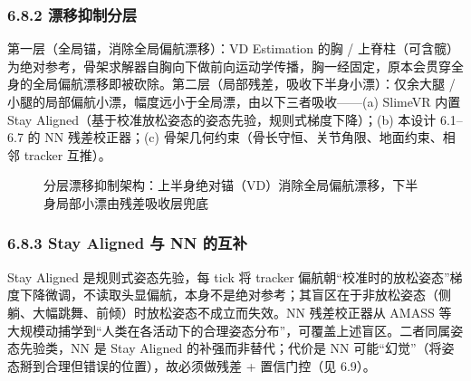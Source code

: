 \documentclass[UTF8,11pt,a4paper]{ctexart}
\begin{document}
\subsubsection{6.8.2 漂移抑制分层}
第一层（全局锚，消除全局偏航漂移）：VD Estimation 的胸 / 上脊柱（可含髋）为绝对参考，骨架求解器自胸向下做前向运动学传播，胸一经固定，原本会贯穿全身的全局偏航漂移即被砍除。第二层（局部残差，吸收下半身小漂）：仅余大腿 / 小腿的局部偏航小漂，幅度远小于全局漂，由以下三者吸收——(a) SlimeVR 内置 Stay Aligned（基于校准放松姿态的姿态先验，规则式梯度下降）；(b) 本设计 6.1–6.7 的 NN 残差校正器；(c) 骨架几何约束（骨长守恒、关节角限、地面约束、相邻 tracker 互推）。

\begin{figure}[H]
\centering
{}
\caption{分层漂移抑制架构：上半身绝对锚（VD）消除全局偏航漂移，下半身局部小漂由残差吸收层兜底}
\label{fig:layered_arch}
\end{figure}

\subsubsection{6.8.3 Stay Aligned 与 NN 的互补}
Stay Aligned 是规则式姿态先验，每 tick 将 tracker 偏航朝“校准时的放松姿态”梯度下降微调，不读取头显偏航，本身不是绝对参考；其盲区在于非放松姿态（侧躺、大幅跳舞、前倾）时放松姿态不成立而失效。NN 残差校正器从 AMASS 等大规模动捕学到“人类在各活动下的合理姿态分布”，可覆盖上述盲区。二者同属姿态先验类，NN 是 Stay Aligned 的补强而非替代；代价是 NN 可能“幻觉”（将姿态掰到合理但错误的位置），故必须做残差 + 置信门控（见 6.9）。
\end{document}
